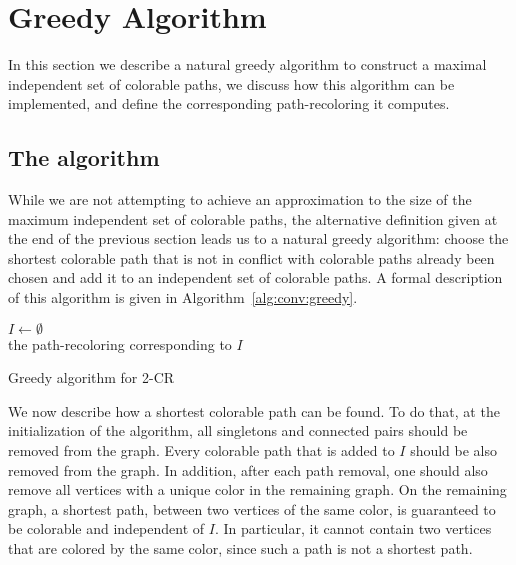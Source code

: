 
\section{Greedy Algorithm}
\label{sec:greedy}

In this section we describe a natural greedy algorithm to construct a maximal
independent set of colorable paths, 
we discuss how this algorithm can be implemented,
and define the corresponding path-recoloring it computes.


\subsection{The algorithm}
%
While we are not attempting to achieve an approximation to the size
of the maximum independent set of colorable paths,
the alternative definition given at the end of the previous section
leads us to a natural greedy algorithm: 
choose the shortest colorable path that 
is not in conflict with colorable paths already been chosen and add it
to an independent set of colorable paths.
%
A formal description of this algorithm is given in
Algorithm~\ref{alg:conv:greedy}.

\begin{algorithm}

$I \gets \emptyset$ \\
\Return the path-recoloring corresponding to $I$

\caption{Greedy algorithm for 2-CR}
\label{alg:conv:greedy}
\end{algorithm}

We now describe how a shortest colorable path can be found.
%
To do that, 
at the initialization of the algorithm, 
all singletons and connected pairs should be removed from the graph.  
%
Every colorable path that is added to $I$ should be also removed from the graph.  
%
In addition, 
after each path removal, 
one should also remove all vertices with a unique color in the remaining graph.  
%
On the remaining graph, 
a shortest path, 
between two vertices of the same color, 
is guaranteed to be colorable and independent of $I$.
%
In particular,
it cannot contain two vertices that are colored by the same color, 
since such a path is not a shortest path.

